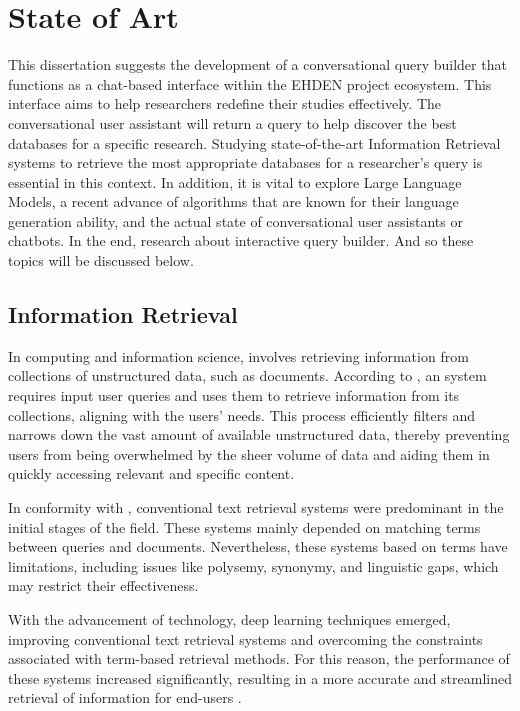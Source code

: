 \chapter{State of Art}
\label{chapter:SA}

This dissertation suggests the development of a conversational query builder that functions as a chat-based interface within the EHDEN project ecosystem. This interface aims to help researchers redefine their studies effectively. The conversational user assistant will return a query to help discover the best databases for a specific research. Studying state-of-the-art Information Retrieval systems to retrieve the most appropriate databases for a researcher's query is essential in this context. In addition, it is vital to explore Large Language Models, a recent advance of algorithms that are known for their language generation ability, and the actual state of conversational user assistants or chatbots. In the end, research about interactive query builder. And so these topics will be discussed below.


\section{Information Retrieval}

In computing and information science, {\ir} involves retrieving information from collections of unstructured data, such as documents. According to \citet{p_m_efficient_2021}, an {\ir} system requires input user queries and uses them to retrieve information from its collections, aligning with the users' needs. This process efficiently filters and narrows down the vast amount of available unstructured data, thereby preventing users from being overwhelmed by the sheer volume of data and aiding them in quickly accessing relevant and specific content.

In conformity with \citet{hambarde_information_2023}, conventional text retrieval systems were predominant in the initial stages of the {\ir} field. These systems mainly depended on matching terms between queries and documents. Nevertheless, these systems based on terms have limitations, including issues like polysemy, synonymy, and linguistic gaps, which may restrict their effectiveness.

With the advancement of technology, deep learning techniques emerged, improving conventional text retrieval systems and overcoming the constraints associated with term-based retrieval methods. For this reason, the performance of these systems increased significantly, resulting in a more accurate and streamlined retrieval of information for end-users \cite{hambarde_information_2023}.

